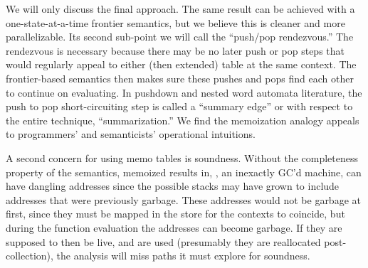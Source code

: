We will only discuss the final approach.
%
The same result can be achieved with a one-state-at-a-time frontier semantics, but we believe this is cleaner and more parallelizable.
%
Its second sub-point we will call the ``push/pop rendezvous.''
%
The rendezvous is necessary because there may be no later push or pop steps that would regularly appeal to either (then extended) table at the same context.
%
The frontier-based semantics then makes sure these pushes and pops find each other to continue on evaluating.
%
In pushdown and nested word automata literature, the push to pop short-circuiting step is called a ``summary edge'' or with respect to the entire technique, ``summarization.''
%
We find the memoization analogy appeals to programmers' and semanticists' operational intuitions.
%

%
A second concern for using memo tables is soundness.
%
Without the completeness property of the semantics, memoized results in, \eg{}, an inexactly GC'd machine, can have dangling addresses since the possible stacks may have grown to include addresses that were previously garbage.
%
These addresses would not be garbage at first, since they must be mapped in the store for the contexts to coincide, but during the function evaluation the addresses can become garbage.
%
If they are supposed to then be live, and are used (presumably they are reallocated post-collection), the analysis will miss paths it must explore for soundness.
%


